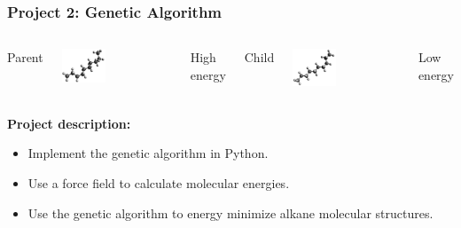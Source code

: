 \documentclass{beamer}
\begin{document}
\frame
{
    \frametitle{Project 2: Genetic Algorithm}

    \begin{columns}[c]
      \centering
      Parent

      \includegraphics[width=0.4\textwidth]{images/genetics_unsorted.png}

      High energy

      \centering
      Child

      \includegraphics[width=0.4\textwidth]{images/genetics_sorted.png}

      Low energy

    \end{columns}

    \qquad
    \newline
    \qquad

    {\bf Project description:}
    \begin{itemize}

        \item Implement the genetic algorithm in Python.

        \smallskip

        \item Use a force field to calculate molecular energies.

        \smallskip

        \item Use the genetic algorithm to energy minimize alkane 
                molecular structures.

    \end{itemize}
}
\end{document}
